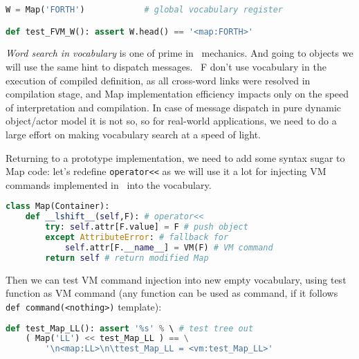\clearpage{}\label{vocab}

\begin{lstlisting}[language=Python]
W = Map('FORTH')			# global vocabulary register

def test_FVM_W(): assert W.head() == '<map:FORTH>'
\end{lstlisting}

\emph{Word search in vocabulary} is one of prime in \F\ mechanics. And going to
objects we will use the same hint to dispatch messages. \F\ F don't use
vocabulary in the execution of compiled definition, as all cross-word links were
resolved in compilation stage, and Map implementation efficiency impacts only on
the speed of interpretation and compilation. In case of message dispatch in pure
dynamic object/actor model it is not so, so for real-world applications, we need
to do a large effort on making vocabulary search at a speed of light.

\bigskip
Returning to a prototype implementation, we need to add some syntax sugar to Map
code: let's redefine \verb|operator<<| as we will use it a lot for injecting VM
commands implemented in \py\ into the vocabulary.

\begin{lstlisting}[language=Python]
class Map(Container):
	def __lshift__(self,F): # operator<<
		try: self.attr[F.value] = F # push object
		except AttributeError: # fallback for 
			self.attr[F.__name__] = VM(F) # VM command
		return self # return modified Map
\end{lstlisting}
\clearpage\noindent
Then we can test VM command injection into new empty vocabulary, using test
function as VM command (any function can be used as command, if it follows  
\verb|def command(<nothing>)| template):
\begin{lstlisting}[language=Python]
def test_Map_LL(): assert '%s' % \ # test tree out
	( Map('LL') << test_Map_LL ) == \
		'\n<map:LL>\n\ttest_Map_LL = <vm:test_Map_LL>'
\end{lstlisting}
